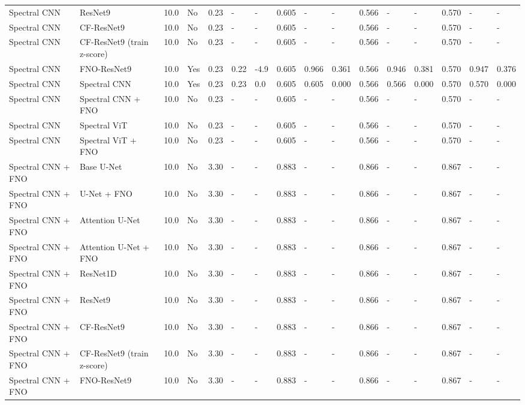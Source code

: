 \begin{longtable}{llllllllllllllll}
Spectral CNN & ResNet9 & 10.0 & No & 0.23 & - & - & 0.605 & - & - & 0.566 & - & - & 0.570 & - & - \\
Spectral CNN & CF-ResNet9 & 10.0 & No & 0.23 & - & - & 0.605 & - & - & 0.566 & - & - & 0.570 & - & - \\
Spectral CNN & CF-ResNet9 (train z-score) & 10.0 & No & 0.23 & - & - & 0.605 & - & - & 0.566 & - & - & 0.570 & - & - \\
Spectral CNN & FNO-ResNet9 & 10.0 & Yes & 0.23 & 0.22 & -4.9 & 0.605 & 0.966 & 0.361 & 0.566 & 0.946 & 0.381 & 0.570 & 0.947 & 0.376 \\
Spectral CNN & Spectral CNN & 10.0 & Yes & 0.23 & 0.23 & 0.0 & 0.605 & 0.605 & 0.000 & 0.566 & 0.566 & 0.000 & 0.570 & 0.570 & 0.000 \\
Spectral CNN & Spectral CNN + FNO & 10.0 & No & 0.23 & - & - & 0.605 & - & - & 0.566 & - & - & 0.570 & - & - \\
Spectral CNN & Spectral ViT & 10.0 & No & 0.23 & - & - & 0.605 & - & - & 0.566 & - & - & 0.570 & - & - \\
Spectral CNN & Spectral ViT + FNO & 10.0 & No & 0.23 & - & - & 0.605 & - & - & 0.566 & - & - & 0.570 & - & - \\
Spectral CNN + FNO & Base U-Net & 10.0 & No & 3.30 & - & - & 0.883 & - & - & 0.866 & - & - & 0.867 & - & - \\
Spectral CNN + FNO & U-Net + FNO & 10.0 & No & 3.30 & - & - & 0.883 & - & - & 0.866 & - & - & 0.867 & - & - \\
Spectral CNN + FNO & Attention U-Net & 10.0 & No & 3.30 & - & - & 0.883 & - & - & 0.866 & - & - & 0.867 & - & - \\
Spectral CNN + FNO & Attention U-Net + FNO & 10.0 & No & 3.30 & - & - & 0.883 & - & - & 0.866 & - & - & 0.867 & - & - \\
Spectral CNN + FNO & ResNet1D & 10.0 & No & 3.30 & - & - & 0.883 & - & - & 0.866 & - & - & 0.867 & - & - \\
Spectral CNN + FNO & ResNet9 & 10.0 & No & 3.30 & - & - & 0.883 & - & - & 0.866 & - & - & 0.867 & - & - \\
Spectral CNN + FNO & CF-ResNet9 & 10.0 & No & 3.30 & - & - & 0.883 & - & - & 0.866 & - & - & 0.867 & - & - \\
Spectral CNN + FNO & CF-ResNet9 (train z-score) & 10.0 & No & 3.30 & - & - & 0.883 & - & - & 0.866 & - & - & 0.867 & - & - \\
Spectral CNN + FNO & FNO-ResNet9 & 10.0 & No & 3.30 & - & - & 0.883 & - & - & 0.866 & - & - & 0.867 & - & - \\

\end{longtable}
